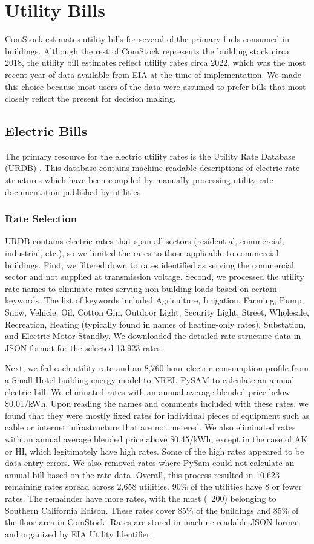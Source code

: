 \section{Utility Bills}
ComStock estimates utility bills for several of the primary fuels consumed in buildings.
Although the rest of ComStock represents the building stock circa 2018, the utility bill estimates reflect utility rates
circa 2022, which was the most recent year of data available from EIA at the time of implementation. We made this choice
because most users of the data were assumed to prefer bills that most closely reflect the present for decision making.

\subsection{Electric Bills}
The primary resource for the electric utility rates is the Utility Rate Database (URDB) \citep{urdb}. This database contains machine-readable descriptions of electric rate structures which have been compiled by manually processing utility rate documentation published by utilities.

\subsubsection{Rate Selection}
URDB contains electric rates that span all sectors (residential, commercial, industrial, etc.), so we limited the rates to those applicable to commercial buildings. First, we filtered down to rates identified as serving the commercial sector and not supplied at transmission voltage. Second, we processed the utility rate names to eliminate rates serving non-building loads based on certain keywords. The list of keywords included Agriculture, Irrigation, Farming, Pump, Snow, Vehicle, Oil, Cotton Gin, Outdoor Light, Security Light, Street, Wholesale, Recreation, Heating (typically found in names of heating-only rates), Substation, and Electric Motor Standby. We downloaded the detailed rate structure data in JSON format for the selected 13,923 rates.

Next, we fed each utility rate and an 8,760-hour electric consumption profile from a Small Hotel building energy model to NREL PySAM \citep{pysam} to calculate an annual electric bill. We eliminated rates with an annual average blended price below \$0.01/kWh. Upon reading the names and comments included with these rates, we found that they were mostly fixed rates for individual pieces of equipment such as cable or internet infrastructure that are not metered. We also eliminated rates with an annual average blended price above \$0.45/kWh, except in the case of AK or HI, which legitimately have high rates. Some of the high rates appeared to be data entry errors. We also removed rates where PySam could not calculate an annual bill based on the rate data. Overall, this process resulted in 10,623 remaining rates spread across 2,658 utilities. 90\% of the utilities have 8 or fewer rates. The remainder have more rates, with the most (~200) belonging to Southern California Edison. These rates cover 85\% of the buildings and 85\% of the floor area in ComStock. Rates are stored in machine-readable JSON format and organized by EIA Utility Identifier.

